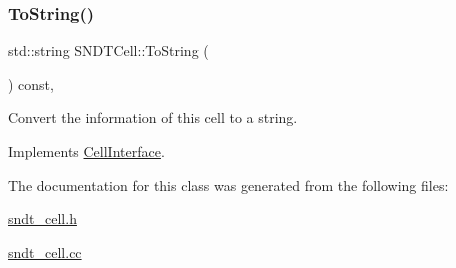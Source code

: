 \mbox{\label{classSNDTCell_a396e9b04c4ce9976868b0b3f12aa1021}} 
\subsubsection{\texorpdfstring{To\+String()}{ToString()}}
{\footnotesize\ttfamily std\+::string S\+N\+D\+T\+Cell\+::\+To\+String (\begin{DoxyParamCaption}{ }\end{DoxyParamCaption}) const\hspace{0.3cm}{\ttfamily [override]}, {\ttfamily [virtual]}}



Convert the information of this cell to a string. 



Implements \hyperlink{classCellInterface_aaf0e64422724ac733741783a4323a4c2}{Cell\+Interface}.



The documentation for this class was generated from the following files\+:\begin{DoxyCompactItemize}
\item 
\hyperlink{sndt__cell_8h}{sndt\+\_\+cell.\+h}\item 
\hyperlink{sndt__cell_8cc}{sndt\+\_\+cell.\+cc}\end{DoxyCompactItemize}
